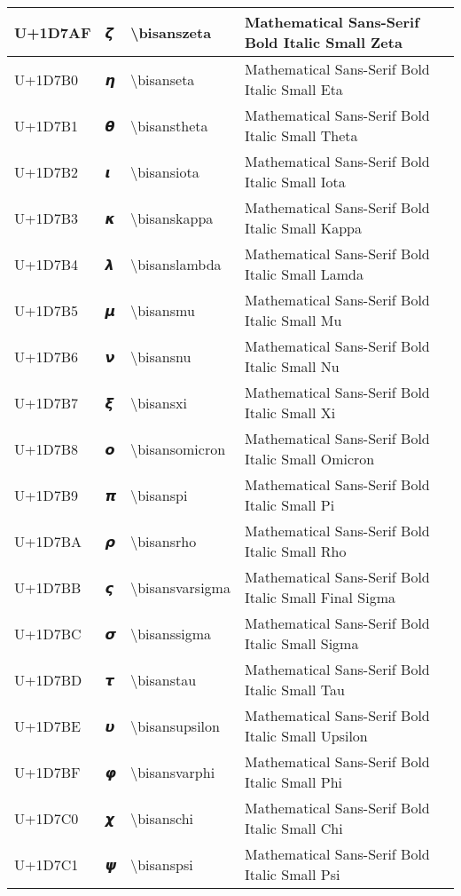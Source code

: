\begin{table}[h]
\begin{tabulary}{\linewidth}{|L|L|L|L|}
\hline
U+1D7AF & 𝞯 & {\textbackslash}bisanszeta & Mathematical Sans-Serif Bold Italic Small Zeta \\
\hline
U+1D7B0 & 𝞰 & {\textbackslash}bisanseta & Mathematical Sans-Serif Bold Italic Small Eta \\
\hline
U+1D7B1 & 𝞱 & {\textbackslash}bisanstheta & Mathematical Sans-Serif Bold Italic Small Theta \\
\hline
U+1D7B2 & 𝞲 & {\textbackslash}bisansiota & Mathematical Sans-Serif Bold Italic Small Iota \\
\hline
U+1D7B3 & 𝞳 & {\textbackslash}bisanskappa & Mathematical Sans-Serif Bold Italic Small Kappa \\
\hline
U+1D7B4 & 𝞴 & {\textbackslash}bisanslambda & Mathematical Sans-Serif Bold Italic Small Lamda \\
\hline
U+1D7B5 & 𝞵 & {\textbackslash}bisansmu & Mathematical Sans-Serif Bold Italic Small Mu \\
\hline
U+1D7B6 & 𝞶 & {\textbackslash}bisansnu & Mathematical Sans-Serif Bold Italic Small Nu \\
\hline
U+1D7B7 & 𝞷 & {\textbackslash}bisansxi & Mathematical Sans-Serif Bold Italic Small Xi \\
\hline
U+1D7B8 & 𝞸 & {\textbackslash}bisansomicron & Mathematical Sans-Serif Bold Italic Small Omicron \\
\hline
U+1D7B9 & 𝞹 & {\textbackslash}bisanspi & Mathematical Sans-Serif Bold Italic Small Pi \\
\hline
U+1D7BA & 𝞺 & {\textbackslash}bisansrho & Mathematical Sans-Serif Bold Italic Small Rho \\
\hline
U+1D7BB & 𝞻 & {\textbackslash}bisansvarsigma & Mathematical Sans-Serif Bold Italic Small Final Sigma \\
\hline
U+1D7BC & 𝞼 & {\textbackslash}bisanssigma & Mathematical Sans-Serif Bold Italic Small Sigma \\
\hline
U+1D7BD & 𝞽 & {\textbackslash}bisanstau & Mathematical Sans-Serif Bold Italic Small Tau \\
\hline
U+1D7BE & 𝞾 & {\textbackslash}bisansupsilon & Mathematical Sans-Serif Bold Italic Small Upsilon \\
\hline
U+1D7BF & 𝞿 & {\textbackslash}bisansvarphi & Mathematical Sans-Serif Bold Italic Small Phi \\
\hline
U+1D7C0 & 𝟀 & {\textbackslash}bisanschi & Mathematical Sans-Serif Bold Italic Small Chi \\
\hline
U+1D7C1 & 𝟁 & {\textbackslash}bisanspsi & Mathematical Sans-Serif Bold Italic Small Psi \\

\end{tabulary}
\end{table}
